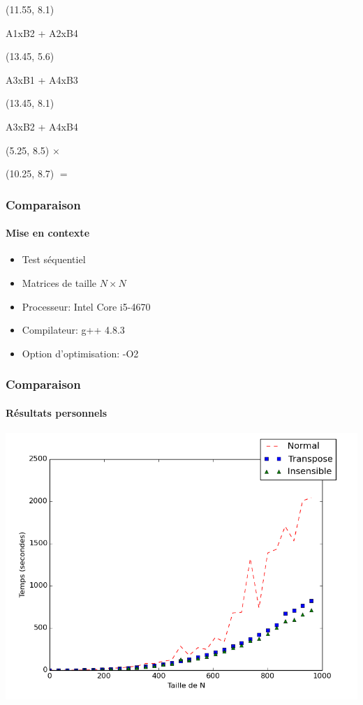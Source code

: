 \documentclass{beamer}
\begin{document}
\begin{frame}[fragile]
\begin{textblock}{1}(11.55, 8.1)
\begin{center}
	 A1xB2 + A2xB4
	 \end{center}	
\end{textblock}

\begin{textblock}{1}(13.45, 5.6)
\begin{center}
	 A3xB1 + A4xB3
	 \end{center}	
\end{textblock}

\begin{textblock}{1}(13.45, 8.1)
\begin{center}
	 A3xB2 + A4xB4
	 \end{center}	
\end{textblock}

\begin{textblock}{5}(5.25, 8.5)
	 \Huge{$\times$}
\end{textblock}

\begin{textblock}{5}(10.25, 8.7)
	 \Huge{$=$}
\end{textblock}

\end{frame}


\begin{frame}
\frametitle{Comparaison}
\framesubtitle{Mise en contexte}
\begin{itemize}
\item Test séquentiel
\item Matrices de taille $N \times N$
\item Processeur: Intel Core i5-4670
\item Compilateur: g++ 4.8.3
\item Option d'optimisation: -O2
\end{itemize}
\end{frame}

\begin{frame}
\frametitle{Comparaison}
\framesubtitle{Résultats personnels}
\begin{center}
\colorbox{white}{\includegraphics[scale=0.4]{matmult_all.png}}
\end{center}
\end{frame}
\end{document}
